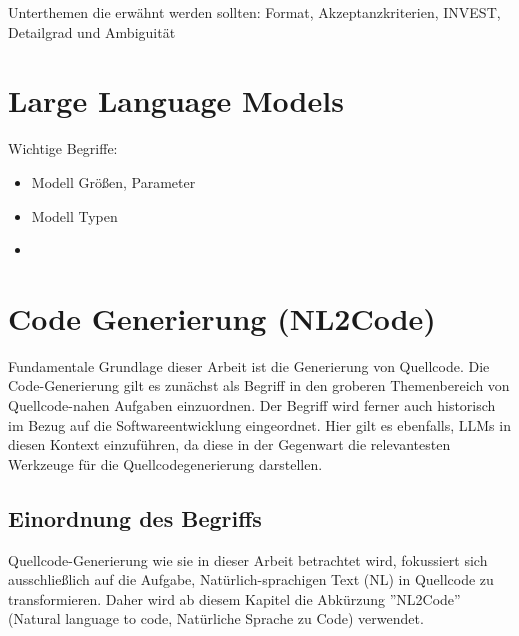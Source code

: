 Unterthemen die erwähnt werden sollten: Format, Akzeptanzkriterien, INVEST, Detailgrad und Ambiguität

\section{Large Language Models}\label{ch:Large Language Models}


Wichtige Begriffe:

\begin{itemize}
    \item Modell Größen, Parameter
    \item Modell Typen
    \item 
\end{itemize}


\section{Code Generierung (NL2Code)}\label{ch:Code Generierung (NL2Code)}

Fundamentale Grundlage dieser Arbeit ist die Generierung von Quellcode. Die Code-Generierung gilt es zunächst als Begriff in den groberen Themenbereich von Quellcode-nahen Aufgaben einzuordnen. Der Begriff wird ferner auch historisch im Bezug auf die Softwareentwicklung eingeordnet. Hier gilt es ebenfalls, LLMs in diesen Kontext einzuführen, da diese in der Gegenwart die relevantesten Werkzeuge für die Quellcodegenerierung darstellen.


\subsection{Einordnung des Begriffs}\label{ch:Einordnung des Begriffs}

Quellcode-Generierung wie sie in dieser Arbeit betrachtet wird, fokussiert sich ausschließlich auf die Aufgabe, Natürlich-sprachigen Text (NL) in Quellcode zu transformieren. Daher wird ab diesem Kapitel die Abkürzung ''NL2Code'' (Natural language to code, Natürliche Sprache zu Code) verwendet. 

